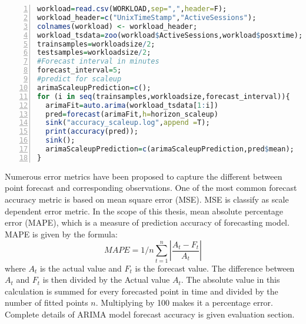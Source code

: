 \begin{lstlisting}[language=R,caption=ARIMA Scaleup Model,label=list:predscaleup,numbers=left,frame=single,fontadjust=true,breaklines,basicstyle=\small]
workload=read.csv(WORKLOAD,sep=",",header=F);
workload_header=c("UnixTimeStamp","ActiveSessions");
colnames(workload) <- workload_header;
workload_tsdata=zoo(workload$ActiveSessions,workload$posxtime);
trainsamples=workloadsize/2;
testsamples=workloadsize/2;
#Forecast interval in minutes
forecast_interval=5;
#predict for scaleup
arimaScaleupPrediction=c();
for (i in seq(trainsamples,workloadsize,forecast_interval)){
  arimaFit=auto.arima(workload_tsdata[1:i])
  pred=forecast(arimaFit,h=horizon_scaleup)
  sink("accuracy_scaleup.log",append =T);
  print(accuracy(pred));
  sink();
  arimaScaleupPrediction=c(arimaScaleupPrediction,pred$mean);
}
\end{lstlisting}
Numerous error metrics have been proposed to capture the different between point forecast and corresponding observations. One of the most common forecast accuracy metric is based on mean square error (MSE)\cite{makridakis2008forecasting}. MSE is classify as scale dependent error metric. In the scope of this thesis, mean absolute percentage error (MAPE)\cite{makridakis2008forecasting}, which is a measure of prediction accuracy of forecasting model. MAPE is given by the formula:
\begin{equation}
  MAPE = 1/n \sum_{t=1}^{n} |\frac{A_{t}-F_{t}}{A_{t}}|
\end{equation}
where \(A_{t}\) is the actual value and \(F_{t}\) is the forecast value. The difference between \(A_{t}\) and \(F_{t}\) is then divided by the Actual value \(A_{t}\). The absolute value in this calculation is summed for every forecasted point in time and divided by the number of fitted points \(n\). Multiplying by 100 makes it a percentage error. Complete details of ARIMA model forecast accuracy is given evaluation section.
